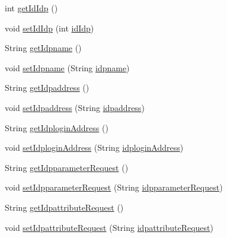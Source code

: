 \begin{DoxyCompactItemize}
\item 
int \hyperlink{classportal_1_1registration_1_1domain_1_1Idp_a85c3d7f485c004bde2248f5bd88d711f}{getIdIdp} ()
\item 
void \hyperlink{classportal_1_1registration_1_1domain_1_1Idp_a229816ea0c398ccc45a67790a1ab0ec5}{setIdIdp} (int \hyperlink{classportal_1_1registration_1_1domain_1_1Idp_a73cc8adc0bc9d24116a0f5ca6ab8a2bf}{idIdp})
\item 
String \hyperlink{classportal_1_1registration_1_1domain_1_1Idp_a8f6dc19913656699268798502dd6bc56}{getIdpname} ()
\item 
void \hyperlink{classportal_1_1registration_1_1domain_1_1Idp_acd4bb136629a96b902b13f879a801b40}{setIdpname} (String \hyperlink{classportal_1_1registration_1_1domain_1_1Idp_a26fab2dd3a812749a8cef7b376d529f7}{idpname})
\item 
String \hyperlink{classportal_1_1registration_1_1domain_1_1Idp_ac8d3fcf8e9cef95d0c26f0a525a069a4}{getIdpaddress} ()
\item 
void \hyperlink{classportal_1_1registration_1_1domain_1_1Idp_a811ba6cef2d8180ba6f8d657d1a8925e}{setIdpaddress} (String \hyperlink{classportal_1_1registration_1_1domain_1_1Idp_a3eaa57b7e2ce7351be26c8eab9dba8e9}{idpaddress})
\item 
String \hyperlink{classportal_1_1registration_1_1domain_1_1Idp_a52ecad06f910b5a478387d0e08c7b8bb}{getIdploginAddress} ()
\item 
void \hyperlink{classportal_1_1registration_1_1domain_1_1Idp_a0c6c4702f1bbacb679b5551f559feeaf}{setIdploginAddress} (String \hyperlink{classportal_1_1registration_1_1domain_1_1Idp_a4690c173d3e4110cd5501e5c7818ae23}{idploginAddress})
\item 
String \hyperlink{classportal_1_1registration_1_1domain_1_1Idp_af916e4ae8d7003fd3c38b120e8e4245e}{getIdpparameterRequest} ()
\item 
void \hyperlink{classportal_1_1registration_1_1domain_1_1Idp_a5f6c75139ff8f3c1ca00d796782aa5cf}{setIdpparameterRequest} (String \hyperlink{classportal_1_1registration_1_1domain_1_1Idp_acd9b443db5b19445703d63d4f340cf9a}{idpparameterRequest})
\item 
String \hyperlink{classportal_1_1registration_1_1domain_1_1Idp_a57afd3534ebddbcef19664967b96a4b9}{getIdpattributeRequest} ()
\item 
void \hyperlink{classportal_1_1registration_1_1domain_1_1Idp_aeb863ed4e2dac243034c31cdfad57233}{setIdpattributeRequest} (String \hyperlink{classportal_1_1registration_1_1domain_1_1Idp_abf267afc4e5c91da690804e5abbef7df}{idpattributeRequest})

\end{DoxyCompactItemize}
